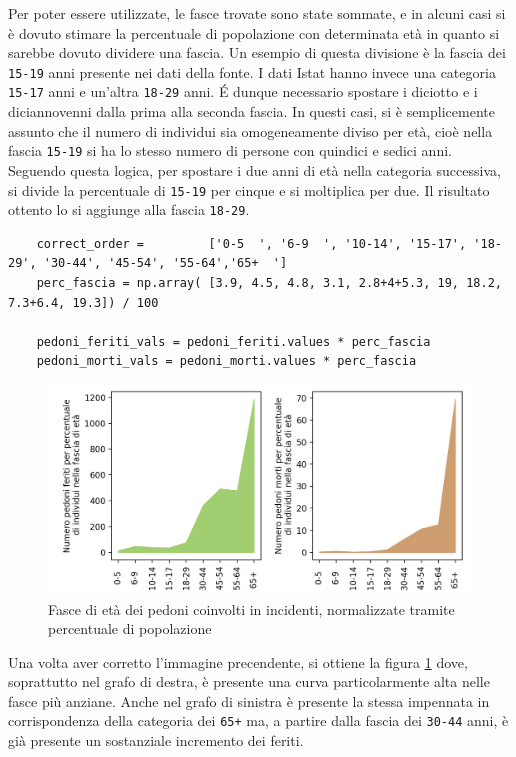 \documentclass[a4paper]{report}
\newcommand{\columnstyle}[1]{\texttt{#1}}
\begin{document}
Per poter essere utilizzate, le fasce trovate sono state sommate, e in alcuni casi si è dovuto 
stimare la percentuale di popolazione con determinata età in quanto si sarebbe dovuto dividere 
una fascia.
Un esempio di questa divisione è la fascia dei \columnstyle{15-19} anni presente nei 
dati della fonte. 
I dati Istat hanno invece una categoria \columnstyle{15-17} anni e un'altra 
\columnstyle{18-29} anni. 
\'E dunque necessario spostare i diciotto e i diciannovenni dalla prima alla seconda fascia. 
In questi casi, si è semplicemente assunto che il numero di individui sia omogeneamente 
diviso per età, cioè nella fascia \columnstyle{15-19} si ha lo stesso numero di persone con 
quindici e sedici anni.
Seguendo questa logica, per spostare i due anni di età nella categoria successiva, si divide 
la percentuale di \columnstyle{15-19} per cinque e si moltiplica per due. 
Il risultato ottento lo si aggiunge alla fascia \columnstyle{18-29}.

\begin{lstlisting}
    correct_order =         ['0-5  ', '6-9  ', '10-14', '15-17', '18-29', '30-44', '45-54', '55-64','65+  ']
    perc_fascia = np.array( [3.9, 4.5, 4.8, 3.1, 2.8+4+5.3, 19, 18.2, 7.3+6.4, 19.3]) / 100

    pedoni_feriti_vals = pedoni_feriti.values * perc_fascia
    pedoni_morti_vals = pedoni_morti.values * perc_fascia
\end{lstlisting}

\begin{figure}
    \includegraphics[width=\linewidth]{../src/incidenti/incidenti_senza_coords/pedoni/eta_pedoni_norm.png}
    \caption{Fasce di età dei pedoni coinvolti in incidenti, normalizzate tramite percentuale di popolazione}
    \label{fig:eta-pedoni-norm}
\end{figure}

Una volta aver corretto l'immagine precendente, si ottiene la figura \ref{fig:eta-pedoni-norm} 
dove, soprattutto nel grafo di destra, è presente una curva particolarmente alta 
nelle fasce più anziane.
Anche nel grafo di sinistra è presente la stessa impennata in corrispondenza 
della categoria dei \columnstyle{65+} ma, a partire dalla fascia 
dei \columnstyle{30-44} anni, è già presente un sostanziale incremento dei feriti.
\end{document}
